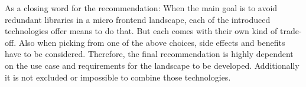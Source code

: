 As a closing word for the recommendation: When the main goal is to avoid redundant libraries in a micro frontend landscape, each of the introduced technologies offer means to do that. But each comes with their own kind of trade-off. Also when picking from one of the above choices, side effects and benefits have to be considered. Therefore, the final recommendation is highly dependent on the use case and requirements for the landscape to be developed.
Additionally it is not excluded or impossible to combine those technologies. 

